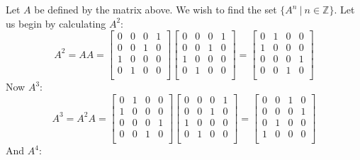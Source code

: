 \documentclass{article}
\begin{document}
Let $A$ be defined by the matrix above. We wish to find the set $\{A^n \: | \: n \in \mathbb{Z}\}$. Let us begin by calculating $A^2$:
\[A^2 = AA = 
\begin{bmatrix}
    0 & 0 & 0 & 1\\
    0 & 0 & 1 & 0\\
    1 & 0 & 0 & 0\\
    0 & 1 & 0 & 0\\
\end{bmatrix}
\begin{bmatrix}
    0 & 0 & 0 & 1\\
    0 & 0 & 1 & 0\\
    1 & 0 & 0 & 0\\
    0 & 1 & 0 & 0\\
\end{bmatrix}
=
\begin{bmatrix}
    0 & 1 & 0 & 0\\
    1 & 0 & 0 & 0\\
    0 & 0 & 0 & 1\\
    0 & 0 & 1 & 0\\
\end{bmatrix}
\]
Now $A^3$:
\[A^3 = A^2A = 
\begin{bmatrix}
    0 & 1 & 0 & 0\\
    1 & 0 & 0 & 0\\
    0 & 0 & 0 & 1\\
    0 & 0 & 1 & 0\\
\end{bmatrix}
\begin{bmatrix}
    0 & 0 & 0 & 1\\
    0 & 0 & 1 & 0\\
    1 & 0 & 0 & 0\\
    0 & 1 & 0 & 0\\
\end{bmatrix}
=
\begin{bmatrix}
    0 & 0 & 1 & 0\\
    0 & 0 & 0 & 1\\
    0 & 1 & 0 & 0\\
    1 & 0 & 0 & 0\\
\end{bmatrix}\]
And $A^4$:
\end{document}
